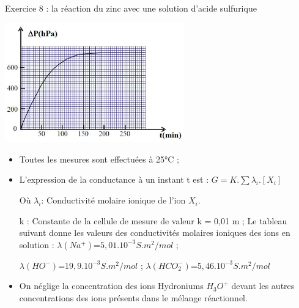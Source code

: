 \documentclass[12pt, french]{article}
\begin{document}
\begin{Box2}{Exercice 8 :  la réaction du zinc avec une solution d’acide sulfurique}
  \begin{center}
	\includegraphics[width=0.58\textwidth]{./img/ex08.png}
  \end{center}

\end{Box2}

\begin{itemize}
	\item Toutes les mesures sont effectuées à 25°C ;
	\item L’expression de la conductance à un instant t est : $G = K.\sum \lambda_i.[X_i]$

		Où $\lambda_i$: Conductivité molaire ionique de l’ion $X_i$.

		k : Constante de la cellule de mesure de valeur k = 0,01 m ;
Le tableau suivant donne les valeurs des conductivités molaires ioniques des ions en
solution : $\lambda(Na^+)$=$5,01.10^{-3}S.m^2/mol$ ;  

$\lambda(HO^-)$=$19,9.10^{-3}S.m^2/mol$ ; $\lambda(HCO_2^-)$=$5,46.10^{-3}S.m^2/mol$
\item On néglige la concentration des ions Hydroniums $H_3O^+$ devant les autres
concentrations des ions présents dans le mélange réactionnel.

\end{itemize}
\end{document}
